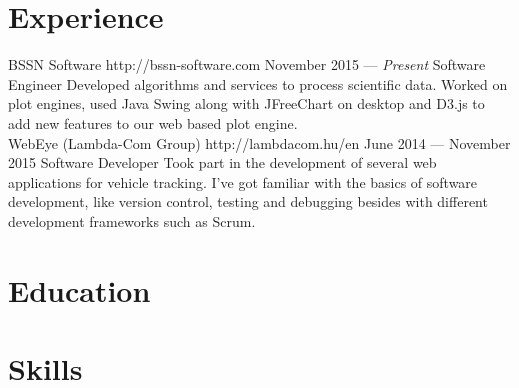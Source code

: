 \documentclass{resume}
\begin{document}

\smallskip

\section{Experience}

\employer
	{BSSN Software}
	{http://bssn-software.com}
	{November 2015 --- \emph{Present}}
	{Software Engineer}
	{Developed algorithms and services to process scientific data. Worked on plot engines, used Java Swing along with JFreeChart on desktop and D3.js to add new features to our web based plot engine.\\}
\employer
	{WebEye (Lambda-Com Group)}
	{http://lambdacom.hu/en}
	{June 2014 --- November 2015}
	{Software Developer}
	{Took part in the development of several web applications for vehicle tracking. I've got familiar with the basics of software development, like version control, testing and debugging besides with different development frameworks such as Scrum.}
	
	
\section{Education}


\section{Skills}

\end{document}
